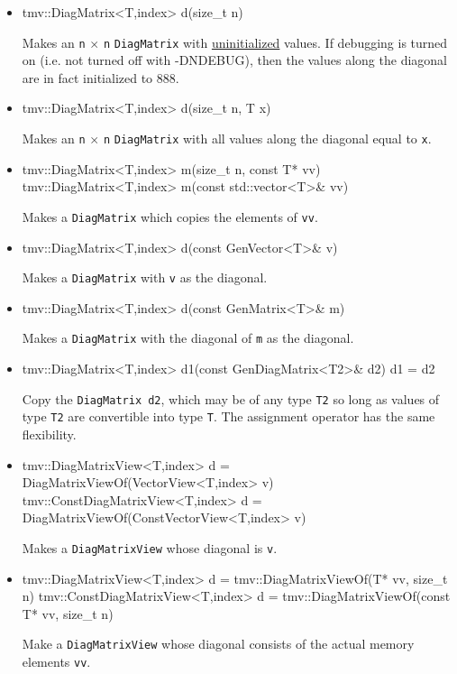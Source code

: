 \documentclass[twoside,letterpaper,11pt]{article}
\renewcommand{\tt}[1]{{\lstinline {#1}}}
\begin{document}
\begin{itemize}
\item 
\begin{tmvcode}
tmv::DiagMatrix<T,index> d(size_t n)
\end{tmvcode}
Makes an \tt{n} $\times$ \tt{n} \tt{DiagMatrix} with \underline{uninitialized} values.
If debugging is turned on (i.e. not turned off
with -DNDEBUG), then the values along the diagonal are in fact initialized to 888. 

\item
\begin{tmvcode}
tmv::DiagMatrix<T,index> d(size_t n, T x)
\end{tmvcode}
Makes an \tt{n} $\times$ \tt{n} \tt{DiagMatrix} with all values along the diagonal equal to \tt{x}.

\item
\begin{tmvcode}
tmv::DiagMatrix<T,index> m(size_t n, const T* vv)
tmv::DiagMatrix<T,index> m(const std::vector<T>& vv)
\end{tmvcode}
Makes a \tt{DiagMatrix} which copies the elements of \tt{vv}.

\item
\begin{tmvcode}
tmv::DiagMatrix<T,index> d(const GenVector<T>& v)
\end{tmvcode}
Makes a \tt{DiagMatrix} with \tt{v} as the diagonal.

\item 
\begin{tmvcode}
tmv::DiagMatrix<T,index> d(const GenMatrix<T>& m)
\end{tmvcode}
Makes a \tt{DiagMatrix} with the diagonal of \tt{m} as the diagonal.

\item
\begin{tmvcode}
tmv::DiagMatrix<T,index> d1(const GenDiagMatrix<T2>& d2)
d1 = d2
\end{tmvcode}
Copy the \tt{DiagMatrix d2}, which may be of any type \tt{T2} so long
as values of type \tt{T2} are convertible into type \tt{T}.
The assignment operator has the same flexibility.

\item
\begin{tmvcode}
tmv::DiagMatrixView<T,index> d = 
      DiagMatrixViewOf(VectorView<T,index> v)
tmv::ConstDiagMatrixView<T,index> d = 
      DiagMatrixViewOf(ConstVectorView<T,index> v)
\end{tmvcode}
Makes a \tt{DiagMatrixView} whose diagonal is \tt{v}.

\item
\begin{tmvcode}
tmv::DiagMatrixView<T,index> d = 
      tmv::DiagMatrixViewOf(T* vv, size_t n)
tmv::ConstDiagMatrixView<T,index> d = 
      tmv::DiagMatrixViewOf(const T* vv, size_t n)
\end{tmvcode}
Make a \tt{DiagMatrixView} whose diagonal consists of the actual memory elements \tt{vv}.

\end{itemize}
\end{document}
